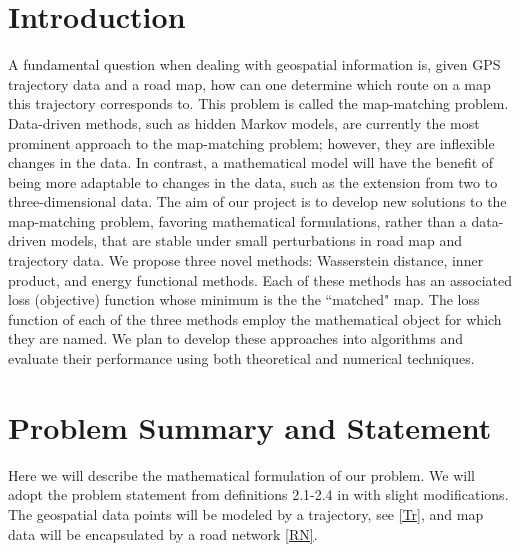\documentclass{article}
\numberwithin{equation}{section}
\theoremstyle{definition}
\begin{document}
\section{Introduction}
A fundamental question when dealing with geospatial information is, given GPS trajectory data and a road map, how can one determine which route on a map this trajectory corresponds to. This problem is called the map-matching problem. 
Data-driven methods, such as hidden Markov models, are currently the most prominent approach to the map-matching problem; however, they are inflexible changes in the data. In contrast, a mathematical model will have the benefit of being more adaptable to changes in the data, such as the extension from two to three-dimensional data. 
The aim of our project is to develop new solutions to the map-matching problem, favoring mathematical formulations, rather than a data-driven models, that are stable under small perturbations in road map and trajectory data. 
% 
We propose three novel methods: Wasserstein distance, inner product, and energy functional methods. Each of these methods has an associated loss (objective) function whose minimum is the the ``matched" map.
The loss function of each of the three methods employ the mathematical object for which they are named. 
We plan to develop these approaches into algorithms and evaluate their performance using both theoretical and numerical techniques. 



\section{Problem Summary and Statement} \label{PS}

Here we will describe the mathematical formulation of our problem. We will adopt the problem statement from definitions 2.1-2.4 in \cite{CXHZ} with slight modifications. The geospatial data points will be modeled by a trajectory, see \autoref{Tr}, and map data will be encapsulated by a road network \autoref{RN}.
\end{document}

